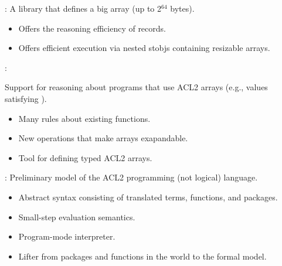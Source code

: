 

\begin{frame}[fragile]

\newlibtitle

:
A library that defines a big array (up to 2$^{64}$ bytes).
\begin{itemize}
\item Offers the reasoning efficiency of records.
\item Offers efficient execution via nested stobjs containing resizable arrays.
\end{itemize}

\end{frame}


\begin{frame}

\newlibtitle

:

Support for reasoning about programs that use ACL2 arrays (e.g.,
values satisfying ).

\begin{itemize}
\item Many rules about existing functions.
\item New operations that make arrays exapandable.
\item Tool for defining typed ACL2 arrays.
\end{itemize}

\end{frame}


\begin{frame}[fragile]

\newlibtitle

:
Preliminary model of the ACL2 programming (not logical) language.
\begin{itemize}
\item Abstract syntax consisting of translated terms, functions, and packages.
\item Small-step evaluation semantics.
\item Program-mode interpreter.
\item Lifter from packages and functions in the world to the formal model.
\end{itemize}

\end{frame}


